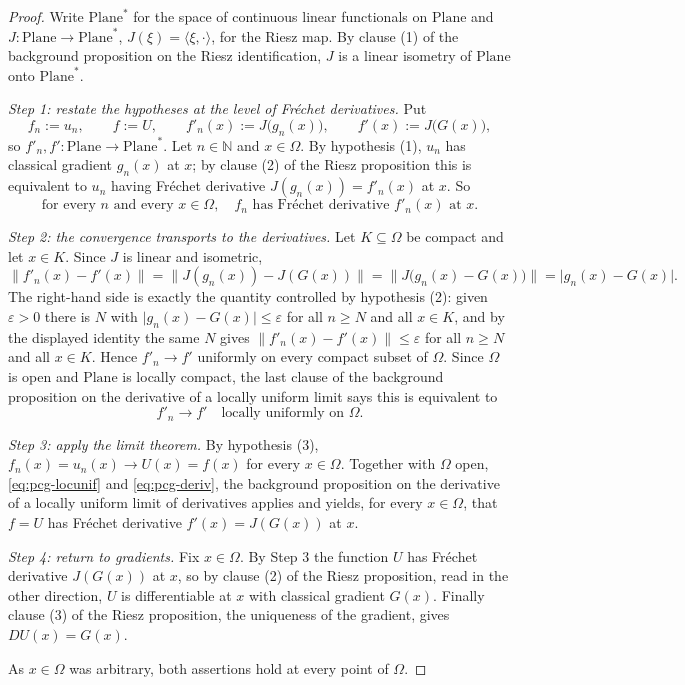 \begin{proof}
Write $\mathrm{Plane}^{*}$ for the space of continuous linear functionals on $\mathrm{Plane}$
and $J\colon\mathrm{Plane}\to\mathrm{Plane}^{*}$, $J(\xi)=\langle\xi,\cdot\rangle$, for the
Riesz map.  By clause (1) of the background proposition on the Riesz identification, $J$ is a
linear isometry of $\mathrm{Plane}$ onto $\mathrm{Plane}^{*}$.

\medskip\noindent\emph{Step 1: restate the hypotheses at the level of Fr\'echet derivatives.}
Put
\[
  f_n:=u_n,\qquad f:=U,\qquad f'_n(x):=J\bigl(g_n(x)\bigr),\qquad f'(x):=J\bigl(G(x)\bigr),
\]
so $f'_n,f'\colon\mathrm{Plane}\to\mathrm{Plane}^{*}$.  Let $n\in\mathbb{N}$ and $x\in\Omega$.
By hypothesis (1), $u_n$ has classical gradient $g_n(x)$ at $x$; by clause (2) of the Riesz
proposition this is equivalent to $u_n$ having Fr\'echet derivative $J(g_n(x))=f'_n(x)$ at $x$.
So
\begin{equation}\label{eq:pcg-deriv}
  \text{for every }n\text{ and every }x\in\Omega,\quad
  f_n\text{ has Fr\'echet derivative }f'_n(x)\text{ at }x .
\end{equation}

\medskip\noindent\emph{Step 2: the convergence transports to the derivatives.}
Let $K\subseteq\Omega$ be compact and let $x\in K$.  Since $J$ is linear and isometric,
\[
  \bigl\lVert f'_n(x)-f'(x)\bigr\rVert
  =\bigl\lVert J(g_n(x))-J(G(x))\bigr\rVert
  =\bigl\lVert J\bigl(g_n(x)-G(x)\bigr)\bigr\rVert
  =\bigl\lvert g_n(x)-G(x)\bigr\rvert .
\]
The right-hand side is exactly the quantity controlled by hypothesis (2): given
$\varepsilon>0$ there is $N$ with $\lvert g_n(x)-G(x)\rvert\le\varepsilon$ for all $n\ge N$ and
all $x\in K$, and by the displayed identity the same $N$ gives
$\lVert f'_n(x)-f'(x)\rVert\le\varepsilon$ for all $n\ge N$ and all $x\in K$.  Hence
$f'_n\to f'$ uniformly on every compact subset of $\Omega$.  Since $\Omega$ is open and
$\mathrm{Plane}$ is locally compact, the last clause of the background proposition on the
derivative of a locally uniform limit says this is equivalent to
\begin{equation}\label{eq:pcg-locunif}
  f'_n\to f'\quad\text{locally uniformly on }\Omega .
\end{equation}

\medskip\noindent\emph{Step 3: apply the limit theorem.}
By hypothesis (3), $f_n(x)=u_n(x)\to U(x)=f(x)$ for every $x\in\Omega$.  Together with
$\Omega$ open, \eqref{eq:pcg-locunif} and \eqref{eq:pcg-deriv}, the background proposition on
the derivative of a locally uniform limit of derivatives applies and yields, for every
$x\in\Omega$, that $f=U$ has Fr\'echet derivative $f'(x)=J(G(x))$ at $x$.

\medskip\noindent\emph{Step 4: return to gradients.}
Fix $x\in\Omega$.  By Step 3 the function $U$ has Fr\'echet derivative $J(G(x))$ at $x$, so by
clause (2) of the Riesz proposition, read in the other direction, $U$ is differentiable at $x$
with classical gradient $G(x)$.  Finally clause (3) of the Riesz proposition, the uniqueness of
the gradient, gives $DU(x)=G(x)$.

\medskip\noindent As $x\in\Omega$ was arbitrary, both assertions hold at every point of
$\Omega$.
\end{proof}
